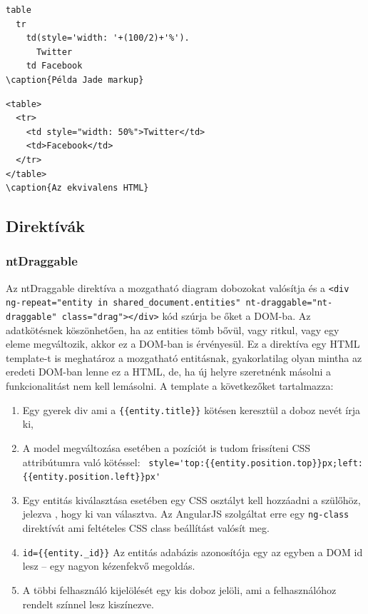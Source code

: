 \begin{lstlisting}
table
  tr
    td(style='width: '+(100/2)+'%').
      Twitter
    td Facebook
\caption{Példa Jade markup}
\end{lstlisting}

\begin{lstlisting}
<table>
  <tr>
    <td style="width: 50%">Twitter</td>
    <td>Facebook</td>
  </tr>
</table>
\caption{Az ekvivalens HTML}
\end{lstlisting}

\subsection{Direktívák}

\subsubsection{ntDraggable}

Az ntDraggable direktíva a mozgatható diagram dobozokat valósítja és a \lstinline|<div ng-repeat="entity in shared_document.entities" nt-draggable="nt-draggable" class="drag"></div>| kód szúrja be őket a DOM-ba. Az adatkötésnek köszönhetően, ha az entities tömb bővül, vagy ritkul, vagy egy eleme megváltozik, akkor ez a DOM-ban is érvényesül. Ez a direktíva egy HTML template-t is meghatároz a mozgatható entitásnak, gyakorlatilag olyan mintha az eredeti DOM-ban lenne ez a HTML, de, ha új helyre szeretnénk másolni a funkcionalitást nem kell lemásolni. A template a következőket tartalmazza:



\begin{enumerate}
\item Egy gyerek div ami a \lstinline|{{entity.title}}| kötésen keresztül a doboz nevét írja ki,
\item A model megváltozása esetében a pozíciót is tudom frissíteni CSS attribútumra való kötéssel: \lstinline| style='top:{{entity.position.top}}px;left:{{entity.position.left}}px'|
\item Egy entitás kiválasztása esetében egy CSS osztályt kell hozzáadni a szülőhöz, jelezva , hogy ki van választva. Az AngularJS szolgáltat erre egy \lstinline{ng-class} direktívát ami feltételes CSS class beállítást valósít meg. 
\item \lstinline|id={{entity._id}}| Az entitás adabázis azonosítója egy az egyben a DOM id lesz -- egy nagyon kézenfekvő megoldás.
\item A többi felhasználó kijelölését egy kis doboz jelöli, ami a felhasználóhoz rendelt színnel lesz kiszínezve.
\end{enumerate}

